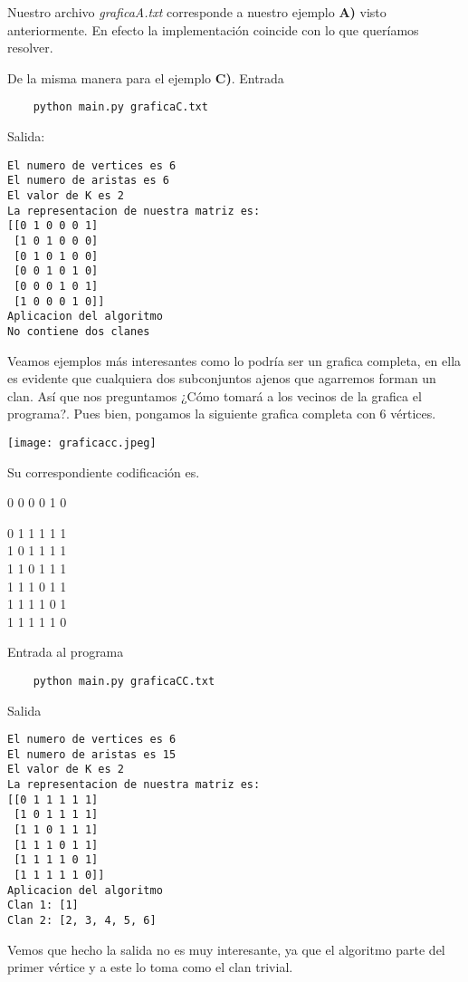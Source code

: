 \documentclass[12pt,letterpaper]{article}
\begin{document}
Nuestro archivo \textit{graficaA.txt} corresponde a nuestro ejemplo \textbf{A)} visto anteriormente. En efecto la implementación coincide con lo que queríamos resolver.

\newpage
De la misma manera para el ejemplo \textbf{C)}.
Entrada
\begin{verbatim}
    python main.py graficaC.txt
\end{verbatim}
    
Salida:
\begin{verbatim}
El numero de vertices es 6
El numero de aristas es 6
El valor de K es 2
La representacion de nuestra matriz es:
[[0 1 0 0 0 1]
 [1 0 1 0 0 0]
 [0 1 0 1 0 0]
 [0 0 1 0 1 0]
 [0 0 0 1 0 1]
 [1 0 0 0 1 0]]
Aplicacion del algoritmo
No contiene dos clanes
\end{verbatim}

Veamos ejemplos más interesantes como lo podría ser un grafica completa, en ella es evidente que cualquiera dos subconjuntos ajenos que agarremos forman un clan. Así que nos preguntamos ¿Cómo tomará a los vecinos de la grafica el programa?. Pues bien, pongamos la siguiente grafica completa con 6 vértices. 

\begin{center}
    \texttt{[image: graficacc.jpeg]}
\end{center}
\newpage
Su correspondiente codificación es.

\begin{center}
0 0 0 0 1 0 


0 1 1 1 1 1  \\
1 0 1 1 1 1  \\
1 1 0 1 1 1 \\
1 1 1 0 1 1 \\
1 1 1 1 0 1 \\
1 1 1 1 1 0 \\
\end{center}
Entrada al programa
\begin{verbatim}
    python main.py graficaCC.txt
\end{verbatim}

Salida
\begin{verbatim}
El numero de vertices es 6
El numero de aristas es 15
El valor de K es 2
La representacion de nuestra matriz es:
[[0 1 1 1 1 1]
 [1 0 1 1 1 1]
 [1 1 0 1 1 1]
 [1 1 1 0 1 1]
 [1 1 1 1 0 1]
 [1 1 1 1 1 0]]
Aplicacion del algoritmo
Clan 1: [1]
Clan 2: [2, 3, 4, 5, 6]
\end{verbatim}

Vemos que hecho la salida no es muy interesante, ya que el algoritmo parte del primer vértice y a este lo toma como el clan trivial.
\end{document}
